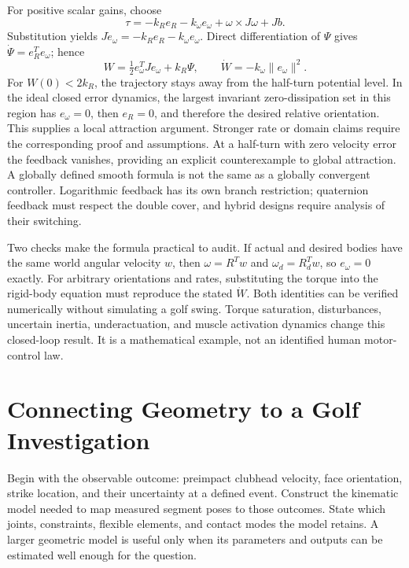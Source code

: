 \documentclass[12pt, openany]{book}
\theoremstyle{plain}
\begin{document}
For positive scalar gains, choose
\begin{equation}\label{eq:pd_so3}
 \tau=-k_R e_R-k_\omega e_\omega+\omega\times J\omega+Jb.
\end{equation}
Substitution yields $J\dot e_\omega=-k_R e_R-k_\omega e_\omega$.
Direct differentiation of $\Psi$ gives $\dot\Psi=e_R^Te_\omega$; hence
\begin{equation}\label{eq:manifold_attitude_energy}
 W=\tfrac12e_\omega^TJe_\omega+k_R\Psi,\qquad
 \dot W=-k_\omega\|e_\omega\|^2.
\end{equation}
For $W(0)<2k_R$, the trajectory stays away from the half-turn potential level.
In the ideal closed error dynamics, the largest invariant zero-dissipation
set in this region has $e_\omega=0$, then $e_R=0$, and therefore the desired
relative orientation. This supplies a local attraction argument. Stronger
rate or domain claims require the corresponding proof and assumptions.
At a half-turn with zero velocity error the feedback vanishes, providing an
explicit counterexample to global attraction. A globally defined smooth
formula is not the same as a globally convergent controller. Logarithmic
feedback has its own branch restriction; quaternion feedback must respect
the double cover, and hybrid designs require analysis of their switching.

Two checks make the formula practical to audit. If actual and desired bodies
have the same world angular velocity $w$, then $\omega=R^Tw$ and
$\omega_d=R_d^Tw$, so $e_\omega=0$ exactly. For arbitrary orientations and
rates, substituting the torque into the rigid-body equation must reproduce
the stated $\dot W$. Both identities can be verified numerically without
simulating a golf swing. Torque saturation, disturbances, uncertain inertia,
underactuation, and muscle activation dynamics change this closed-loop result.
It is a mathematical example, not an identified human motor-control law.

\section{Connecting Geometry to a Golf Investigation}

Begin with the observable outcome: preimpact clubhead velocity, face orientation,
strike location, and their uncertainty at a defined event. Construct the
kinematic model needed to map measured segment poses to those outcomes.
State which joints, constraints, flexible elements, and contact modes the
model retains. A larger geometric model is useful only when its parameters
and outputs can be estimated well enough for the question.
\end{document}
